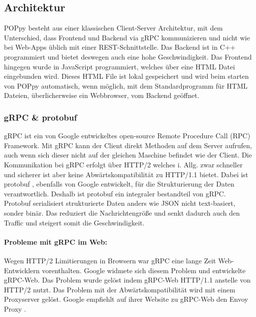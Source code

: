 \documentclass[12pt]{article}
\begin{document}
\subsection{Architektur}
POPpy besteht aus einer klassischen Client-Server Architektur, mit dem 
Unterschied, dass Frontend und Backend via gRPC \cite{grpc} kommunizieren und 
nicht wie bei Web-Apps üblich mit einer REST-Schnittstelle. Das Backend ist in 
C++ programmiert und bietet deswegen auch eine hohe Geschwindigkeit. 
\newline
\newline
Das Frontend hingegen wurde in JavaScript programmiert, welches über eine HTML
Datei eingebunden wird. Dieses HTML File ist lokal gespeichert und wird beim 
starten von POPpy automatisch, wenn möglich, mit dem Standardprogramm für 
HTML Dateien, überlicherweise ein Webbrowser, vom Backend geöffnet.

\subsubsection{gRPC \& protobuf}
gRPC ist ein von Google entwickeltes open-source Remote Procedure Call (RPC) 
Framework. Mit gRPC kann der Client direkt Methoden auf dem Server aufrufen, 
auch wenn sich dieser nicht auf der gleichen Maschine befindet wie der Client.
Die Kommunikation bei gRPC erfolgt über HTTP/2 welches i. Allg. zwar schneller 
und sicherer ist aber keine Abwärtskompatibilität zu HTTP/1.1 bietet.
\newline
\newline
Dabei ist protobuf \cite{protobuf}, ebenfalls von Google entwickelt, für die 
Strukturierung der Daten verantwortlich. Deshalb ist protobuf ein integraler 
bestandteil von gRPC. Protobuf serialisiert strukturierte Daten anders wie JSON 
nicht text-basiert, sonder binär. Das reduziert die Nachrichtengröße und senkt 
dadurch auch den Traffic und steigert somit die Geschwindigkeit.

\paragraph{Probleme mit gRPC im Web:}
Wegen HTTP/2 Limitierungen in Browsern war gRPC eine lange Zeit Web-Entwicklern 
vorenthalten. Google widmete sich diesem Problem und entwickelte gRPC-Web.
\cite{grpc-web}
\newline
Das Problem wurde gelöst indem gRPC-Web HTTP/1.1 anstelle von HTTP/2 nutzt. Das
Problem mit der Abwärtskompatibilität wird mit einem Proxyserver gelöst. Google
empfiehlt auf ihrer Website zu gRPC-Web den Envoy Proxy \cite{envoy}.
\end{document}

